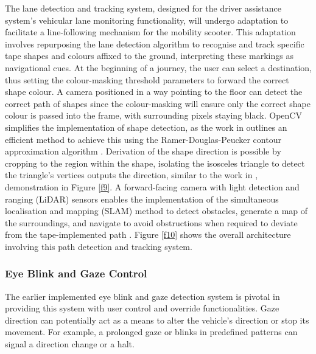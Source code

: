 \documentclass[9pt,conference]{IEEEtran}
\begin{document}
The lane detection and tracking system, designed for the driver assistance system's vehicular lane monitoring functionality, will undergo adaptation to facilitate a line-following mechanism for the mobility scooter. This adaptation involves repurposing the lane detection algorithm to recognise and track specific tape shapes and colours affixed to the ground, interpreting these markings as navigational cues. At the beginning of a journey, the user can select a destination, thus setting the colour-masking threshold parameters to forward the correct shape colour. A camera positioned in a way pointing to the floor can detect the correct path of shapes since the colour-masking will ensure only the correct shape colour is passed into the frame, with surrounding pixels staying black. OpenCV simplifies the implementation of shape detection, as the work in \cite{b27} outlines an efficient method to achieve this using the Ramer-Douglas-Peucker contour approximation algorithm \cite{b28}. Derivation of the shape direction is possible by cropping to the region within the shape, isolating the isosceles triangle to detect the triangle's vertices outputs the direction, similar to the work in \cite{b29}\cite{b30}, demonstration in Figure \ref{f9}. A forward-facing camera with light detection and ranging (LiDAR) sensors enables the implementation of the simultaneous localisation and mapping (SLAM) method to detect obstacles, generate a map of the surroundings, and navigate to avoid obstructions when required to deviate from the tape-implemented path \cite{b31}\cite{b32}. Figure \ref{f10} shows the overall architecture involving this path detection and tracking system.

\subsubsection{Eye Blink and Gaze Control}
The earlier implemented eye blink and gaze detection system is pivotal in providing this system with user control and override functionalities. Gaze direction can potentially act as a means to alter the vehicle's direction or stop its movement. For example, a prolonged gaze or blinks in predefined patterns can signal a direction change or a halt.
\end{document}
